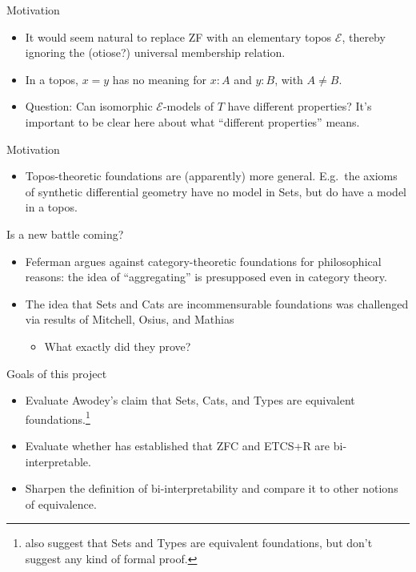 \documentclass[ignorenonframetext,fleqn]{beamer}
\newcommand{\2}{\mathcal}
\begin{document}
\begin{frame}{Motivation}

  \begin{itemize}
  \item It would seem natural to replace ZF with an elementary topos
    $\2E$, thereby ignoring the (otiose?) universal membership
    relation.
  \item In a topos, $x=y$ has no meaning for $x:A$ and $y:B$, with
    $A\neq B$.
  \item Question: Can isomorphic $\2E$-models of $T$ have different
    properties? It's important to be clear here about what ``different
    properties'' means.
  \end{itemize}  

\end{frame}

\begin{frame}{Motivation}

  \begin{itemize}
  \item Topos-theoretic foundations are (apparently) more
    general. E.g.\ the axioms of synthetic differential geometry have
    no model in Sets, but do have a model in a topos.
  \end{itemize}

\end{frame}


\begin{frame}{Is a new battle coming?}

\begin{itemize}  
\item Feferman \citeyearpar{feferman1969,feferman1977} argues against
  category-theoretic foundations for philosophical reasons: the idea
  of ``aggregating'' is presupposed even in category theory.
\item The idea that Sets and Cats are incommensurable foundations was
  challenged via results of Mitchell, Osius, and Mathias
  \begin{itemize}
  \item What exactly did they prove?
  \end{itemize}
\end{itemize}

\end{frame}

\begin{frame}{Goals of this project}

  \begin{itemize}
  \item Evaluate Awodey's \citeyearpar{awodey} claim that Sets, Cats,
    and Types are equivalent foundations.\footnote{\citet{linnebo}
      also suggest that Sets and Types are equivalent foundations, but
      don't suggest any kind of formal proof.}
  \item Evaluate whether \citet{shulman} has established that ZFC and
    ETCS+R are bi-interpretable.
  \item Sharpen the definition of bi-interpretability and compare it
    to other notions of equivalence.
  \end{itemize}

\end{frame}
\end{document}
